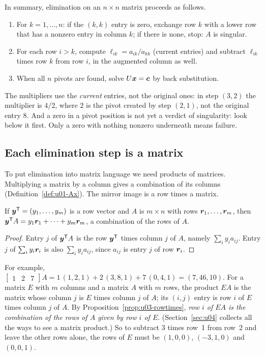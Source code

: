 In summary, elimination on an $n\times n$ matrix proceeds as follows.
\begin{enumerate}
  \item For $k=1,\dots,n$: if the $(k,k)$ entry is zero, exchange row $k$ with a lower row
    that has a nonzero entry in column $k$; if there is none, stop: $A$ is singular.
  \item For each row $i>k$, compute $\ell_{ik}=a_{ik}/a_{kk}$ (current entries) and subtract
    $\ell_{ik}$ times row $k$ from row $i$, in the augmented column as well.
  \item When all $n$ pivots are found, solve $U\boldsymbol{x}=\boldsymbol{c}$ by back substitution.
\end{enumerate}

\begin{trap}
The multipliers use the \emph{current} entries, not the original ones: in step $(3,2)$ the
multiplier is $4/2$, where $2$ is the pivot created by step $(2,1)$, not the original entry
$8$. And a zero in a pivot position is not yet a verdict of singularity: look below it first.
Only a zero with nothing nonzero underneath means failure.
\end{trap}

\subsection{Each elimination step is a matrix}

To put elimination into matrix language we need products of matrices. Multiplying a matrix
by a column gives a combination of its columns (Definition~\ref{def:u01-Ax}). The mirror image
is a row times a matrix.

\begin{proposition}\label{prop:u03-rowtimes}
If $\boldsymbol{y}^{\mathsf{T}}=(y_1,\dots,y_m)$ is a row vector and $A$ is $m\times n$ with rows
$\boldsymbol{r}_1,\dots,\boldsymbol{r}_m$, then $\boldsymbol{y}^{\mathsf{T}} A=y_1\boldsymbol{r}_1+\cdots+y_m\boldsymbol{r}_m$, a combination of
the rows of $A$.
\end{proposition}

\begin{proof}
Entry $j$ of $\boldsymbol{y}^{\mathsf{T}} A$ is the row $\boldsymbol{y}^{\mathsf{T}}$ times column $j$ of $A$, namely
$\sum_i y_ia_{ij}$. Entry $j$ of $\sum_i y_i\boldsymbol{r}_i$ is also $\sum_i y_ia_{ij}$, since
$a_{ij}$ is entry $j$ of row $\boldsymbol{r}_i$.
\end{proof}

For example, $\begin{bmatrix} 1 & 2 & 7\end{bmatrix}A
=1\,(1,2,1)+2\,(3,8,1)+7\,(0,4,1)=(7,46,10)$.
For a matrix $E$ with $m$ columns and a matrix $A$ with $m$ rows, the product $EA$ is the
matrix whose column $j$ is $E$ times column $j$ of $A$; its $(i,j)$ entry is row $i$ of $E$
times column $j$ of $A$. By Proposition~\ref{prop:u03-rowtimes}, \emph{row $i$ of $EA$ is
the combination of the rows of $A$ given by row $i$ of $E$}. (Section~\ref{sec:u04} collects
all the ways to see a matrix product.) So to subtract $3$ times row~1 from row~2 and leave
the other rows alone, the rows of $E$ must be $(1,0,0)$, $(-3,1,0)$ and $(0,0,1)$.

